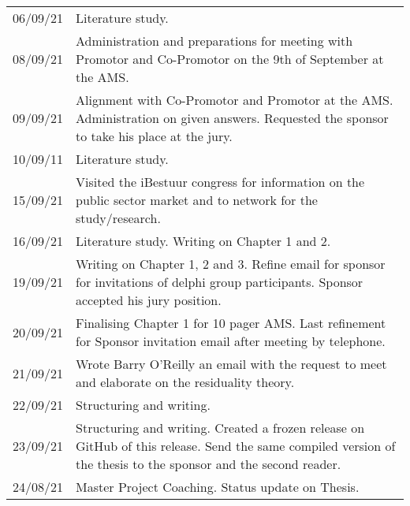 \begin{longtable}{p{}p{}}
			06/09/21 & Literature study.\\%
			08/09/21 & Administration and preparations for meeting with Promotor and Co-Promotor on the 9th of September at the AMS.\\%
			09/09/21 & Alignment with Co-Promotor and Promotor at the AMS. Administration on given answers. Requested the sponsor to take his place at the jury.\\%
			10/09/11 & Literature study.\\%
			15/09/21 & Visited the iBestuur congress for information on the public sector market and to network for the study/research.\\%
			16/09/21 & Literature study. Writing on Chapter 1 and 2.\\%
			19/09/21 & Writing on Chapter 1, 2 and 3. Refine email for sponsor for invitations of delphi group participants. Sponsor accepted his jury position.\\%
			20/09/21 & Finalising Chapter 1 for 10 pager AMS. Last refinement for Sponsor invitation email after meeting by telephone. \\ 
			21/09/21 & Wrote Barry O'Reilly an email with the request to meet and elaborate on the residuality theory.\\%
			22/09/21 & Structuring and writing.\\%
			23/09/21 & Structuring and writing. Created a frozen release on GitHub of this release. Send the same compiled version of the thesis to the sponsor and the second reader.\\%
			24/08/21 & Master Project Coaching. Status update on Thesis.\\%
			\bottomrule %
\end{longtable}